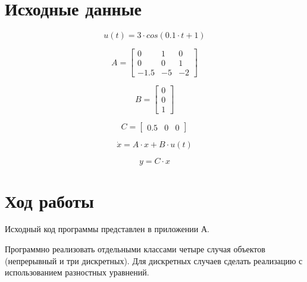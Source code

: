 \documentclass[14pt,a4paper]{extreport}
\begin{document}
\newpage
\chapter*{Исходные данные}

\begin{equation}
    u(t) = 3 \cdot  cos(0.1 \cdot t + 1)
\end{equation}

\begin{equation}
    A = 
    \begin{bmatrix} 
        0 & 1 & 0 \\ 
        0 & 0 & 1 \\
        -1.5 & -5 & -2
    \end{bmatrix}
\end{equation}

\begin{equation}
    B = 
    \begin{bmatrix} 
        0 \\ 
        0 \\
        1
    \end{bmatrix}
\end{equation}

\begin{equation}
    C = 
    \begin{bmatrix} 
        0.5 & 0 & 0
    \end{bmatrix}
\end{equation}

\begin{equation}
\dot x = A \cdot x + B \cdot u(t)
\end{equation}

\begin{equation}
y = C \cdot x
\end{equation}

\chapter*{Ход работы}
Исходный код программы представлен в приложении А. 

Программно реализовать отдельными классами четыре случая объектов 
(непрерывный и три дискретных). Для дискретных случаев сделать 
реализацию с использованием разностных уравнений.
\end{document}
